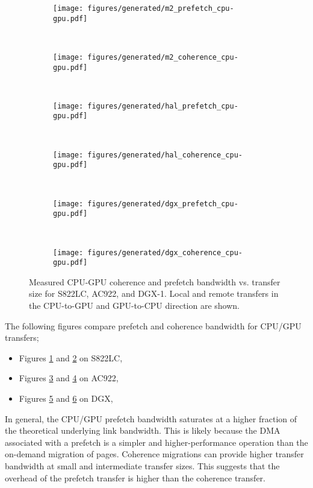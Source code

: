 \begin{figure}[ht]
	\centering
	\begin{subfigure}[b]{0.45\textwidth}
		\texttt{[image: figures/generated/m2\_prefetch\_cpu-gpu.pdf]}
		\caption{}
		\label{fig:um-prefetch-s822lc-cpu-gpu}
	\end{subfigure}
	~
	\begin{subfigure}[b]{0.45\textwidth}
		\texttt{[image: figures/generated/m2\_coherence\_cpu-gpu.pdf]}
		\caption{}
		\label{fig:um-coherence-s822lc-cpu-gpu}
	\end{subfigure}
	\\
	\begin{subfigure}[b]{0.45\textwidth}
		\texttt{[image: figures/generated/hal\_prefetch\_cpu-gpu.pdf]}
		\caption{}
		\label{fig:um-prefetch-ac922-cpu-gpu}
	\end{subfigure}
	~
	\begin{subfigure}[b]{0.45\textwidth}
		\texttt{[image: figures/generated/hal\_coherence\_cpu-gpu.pdf]}
		\caption{}
		\label{fig:um-coherence-ac922-cpu-gpu}
	\end{subfigure}
	\\
	\begin{subfigure}[b]{0.45\textwidth}
		\texttt{[image: figures/generated/dgx\_prefetch\_cpu-gpu.pdf]}
		\caption{}
		\label{fig:um-prefetch-dgx-cpu-gpu}
	\end{subfigure}
	~
	\begin{subfigure}[b]{0.45\textwidth}
		\texttt{[image: figures/generated/dgx\_coherence\_cpu-gpu.pdf]}
		\caption{}
		\label{fig:um-coherence-dgx-cpu-gpu}
	\end{subfigure}
	\caption[CPU/GPU Coherence and Prefetch Bandwidth]{
		Measured CPU-GPU coherence and prefetch bandwidth vs. transfer size  for S822LC, AC922, and DGX-1.
		Local and remote transfers in the CPU-to-GPU and GPU-to-CPU direction are shown.
	}
	\label{fig:um-cpu-gpu}
\end{figure}

The following figures compare prefetch and coherence bandwidth for CPU/GPU transfers;
\begin{itemize}
	\item Figures \ref{fig:um-prefetch-s822lc-cpu-gpu} and \ref{fig:um-coherence-s822lc-cpu-gpu} on S822LC,
	\item Figures \ref{fig:um-prefetch-ac922-cpu-gpu} and \ref{fig:um-coherence-ac922-cpu-gpu}   on AC922,
	\item Figures \ref{fig:um-prefetch-dgx-cpu-gpu} and \ref{fig:um-coherence-dgx-cpu-gpu}       on DGX,
\end{itemize}
In general, the CPU/GPU prefetch bandwidth saturates at a higher fraction of the theoretical underlying link bandwidth.
This is likely because the DMA associated with a prefetch is a simpler and higher-performance operation than the on-demand migration of pages.
Coherence migrations can provide higher transfer bandwidth at small and intermediate transfer sizes.
This suggests that the overhead of the prefetch transfer is higher than the coherence transfer.

